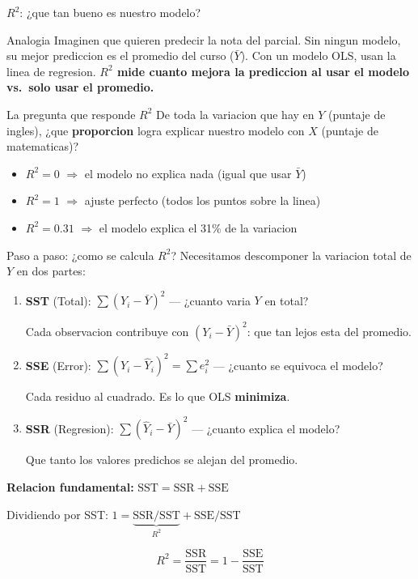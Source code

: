 \documentclass[aspectratio=169, 11pt]{beamer}
\begin{document}
\begin{frame}{$R^2$: ¿que tan bueno es nuestro modelo?}
\begin{exampleblock}{Analogia}
\small
Imaginen que quieren predecir la nota del parcial. Sin ningun modelo, su mejor prediccion es el promedio del curso ($\bar{Y}$). Con un modelo OLS, usan la linea de regresion. \textbf{$R^2$ mide cuanto mejora la prediccion al usar el modelo vs.\ solo usar el promedio.}
\end{exampleblock}

\vspace{0.2cm}
\begin{block}{La pregunta que responde $R^2$}
De toda la variacion que hay en $Y$ (puntaje de ingles), ¿que \textbf{proporcion} logra explicar nuestro modelo con $X$ (puntaje de matematicas)?
\end{block}

\vspace{0.2cm}
\begin{itemize}
  \item $R^2 = 0$ $\Rightarrow$ el modelo no explica nada (igual que usar $\bar{Y}$)
  \item $R^2 = 1$ $\Rightarrow$ ajuste perfecto (todos los puntos sobre la linea)
  \item $R^2 = 0.31$ $\Rightarrow$ el modelo explica el 31\% de la variacion
\end{itemize}
\end{frame}

\begin{frame}{Paso a paso: ¿como se calcula $R^2$?}
\small
Necesitamos descomponer la variacion total de $Y$ en dos partes:

\vspace{0.2cm}
\begin{enumerate}\setlength{\itemsep}{4pt}
  \item \textbf{SST} (Total): $\sum (Y_i - \bar{Y})^2$ --- ¿cuanto varia $Y$ en total?

  Cada observacion contribuye con $(Y_i - \bar{Y})^2$: que tan lejos esta del promedio.

  \item \textbf{SSE} (Error): $\sum (Y_i - \hat{Y}_i)^2 = \sum e_i^2$ --- ¿cuanto se equivoca el modelo?

  Cada residuo al cuadrado. Es lo que OLS \textbf{minimiza}.

  \item \textbf{SSR} (Regresion): $\sum (\hat{Y}_i - \bar{Y})^2$ --- ¿cuanto explica el modelo?

  Que tanto los valores predichos se alejan del promedio.
\end{enumerate}

\vspace{0.2cm}
\textbf{Relacion fundamental:} $\text{SST} = \text{SSR} + \text{SSE}$

\vspace{0.1cm}
Dividiendo por SST: $1 = \underbrace{\text{SSR}/\text{SST}}_{R^2} + \text{SSE}/\text{SST}$

\[
\boxed{R^2 = \frac{\text{SSR}}{\text{SST}} = 1 - \frac{\text{SSE}}{\text{SST}}}
\]
\end{frame}
\end{document}
